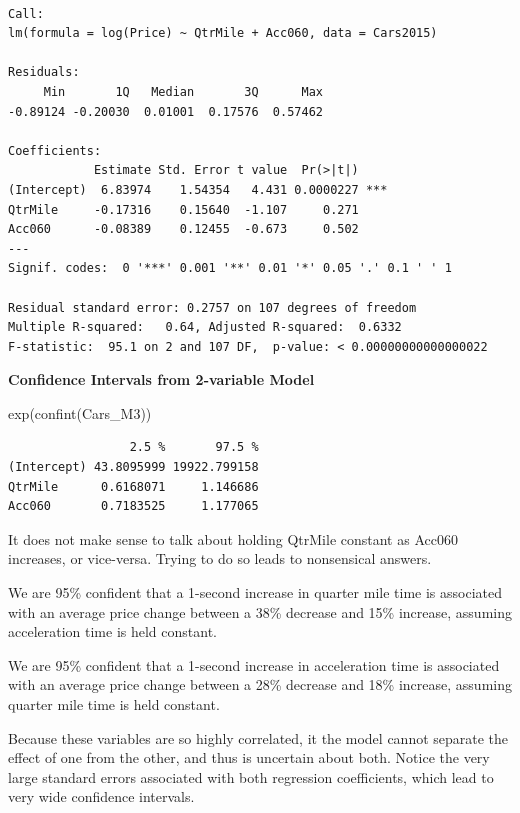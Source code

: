 \documentclass[
  letterpaper,
  DIV=11,
  numbers=noendperiod]{scrreprt}
\newenvironment{Shaded}{\begin{snugshade}}{\end{snugshade}}
\newcommand{\FunctionTok}[1]{\textcolor[rgb]{0.28,0.35,0.67}{#1}}
\newcommand{\NormalTok}[1]{\textcolor[rgb]{0.00,0.23,0.31}{#1}}
\begin{document}
\begin{verbatim}

Call:
lm(formula = log(Price) ~ QtrMile + Acc060, data = Cars2015)

Residuals:
     Min       1Q   Median       3Q      Max 
-0.89124 -0.20030  0.01001  0.17576  0.57462 

Coefficients:
            Estimate Std. Error t value  Pr(>|t|)    
(Intercept)  6.83974    1.54354   4.431 0.0000227 ***
QtrMile     -0.17316    0.15640  -1.107     0.271    
Acc060      -0.08389    0.12455  -0.673     0.502    
---
Signif. codes:  0 '***' 0.001 '**' 0.01 '*' 0.05 '.' 0.1 ' ' 1

Residual standard error: 0.2757 on 107 degrees of freedom
Multiple R-squared:   0.64, Adjusted R-squared:  0.6332 
F-statistic:  95.1 on 2 and 107 DF,  p-value: < 0.00000000000000022
\end{verbatim}

\textbf{Confidence Intervals from 2-variable Model}

\begin{Shaded}
\begin{Highlighting}[]
\FunctionTok{exp}\NormalTok{(}\FunctionTok{confint}\NormalTok{(Cars\_M3))}
\end{Highlighting}
\end{Shaded}

\begin{verbatim}
                 2.5 %       97.5 %
(Intercept) 43.8095999 19922.799158
QtrMile      0.6168071     1.146686
Acc060       0.7183525     1.177065
\end{verbatim}

It does not make sense to talk about holding QtrMile constant as Acc060
increases, or vice-versa. Trying to do so leads to nonsensical answers.

We are 95\% confident that a 1-second increase in quarter mile time is
associated with an average price change between a 38\% decrease and 15\%
increase, assuming acceleration time is held constant.

We are 95\% confident that a 1-second increase in acceleration time is
associated with an average price change between a 28\% decrease and 18\%
increase, assuming quarter mile time is held constant.

Because these variables are so highly correlated, it the model cannot
separate the effect of one from the other, and thus is uncertain about
both. Notice the very large standard errors associated with both
regression coefficients, which lead to very wide confidence intervals.
\end{document}
